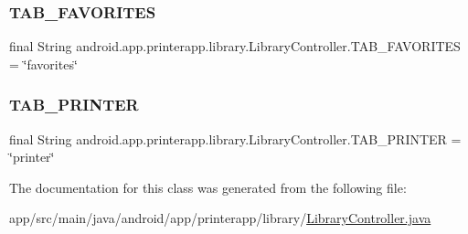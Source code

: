 \subsubsection{\texorpdfstring{T\+A\+B\+\_\+\+F\+A\+V\+O\+R\+I\+T\+ES}{TAB\_FAVORITES}}
{\footnotesize\ttfamily final String android.\+app.\+printerapp.\+library.\+Library\+Controller.\+T\+A\+B\+\_\+\+F\+A\+V\+O\+R\+I\+T\+ES = \char`\"{}favorites\char`\"{}\hspace{0.3cm}{\ttfamily [static]}}

\mbox{\label{classandroid_1_1app_1_1printerapp_1_1library_1_1_library_controller_a82fd601a1fcafb7c5ce4ac2b6807ea41}} 
\subsubsection{\texorpdfstring{T\+A\+B\+\_\+\+P\+R\+I\+N\+T\+ER}{TAB\_PRINTER}}
{\footnotesize\ttfamily final String android.\+app.\+printerapp.\+library.\+Library\+Controller.\+T\+A\+B\+\_\+\+P\+R\+I\+N\+T\+ER = \char`\"{}printer\char`\"{}\hspace{0.3cm}{\ttfamily [static]}}



The documentation for this class was generated from the following file\+:\begin{DoxyCompactItemize}
\item 
app/src/main/java/android/app/printerapp/library/\hyperlink{_library_controller_8java}{Library\+Controller.\+java}\end{DoxyCompactItemize}
